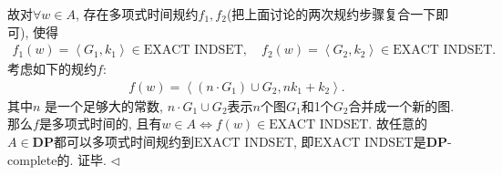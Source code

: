 \documentclass[11pt]{article}
\newcommand{\1}{\mathbf{1}}
\newenvironment{answer}[1][Answer]{\begin{trivlist}
\item[\hskip \labelsep{\bfseries\itshape#1.}\hskip \labelsep]}{\hfill$\lhd$\end{trivlist}}
\begin{document}
\begin{answer}
    故对$\forall w \in A$, 存在多项式时间规约$f_1, f_2$(把上面讨论的两次规约步骤复合一下即可), 使得
    \begin{align*}
        f_1(w) = \left\langle G_1, k_1 \right\rangle \in \text{EXACT INDSET}, \quad f_2(w) = \left\langle G_2, k_2 \right\rangle \in \text{EXACT INDSET}.
    \end{align*}
    考虑如下的规约$f$:
    \begin{align*}
        f(w) = \left\langle (n \cdot G_1) \cup G_2 , n k_1 + k_2 \right\rangle.
    \end{align*}
    其中$n$ 是一个足够大的常数, $n\cdot G_1\cup G_2$表示$n$个图$G_1$和1个$G_2$合并成一个新的图. 那么$f$是多项式时间的, 且有$w \in A \iff  f(w) \in \text{EXACT INDSET}$. 故任意的$A \in \textbf{DP}$都可以多项式时间规约到$\text{EXACT INDSET}$, 即$\text{EXACT INDSET}$是$\textbf{DP}$-complete的. 证毕.
\end{answer}
\end{document}
